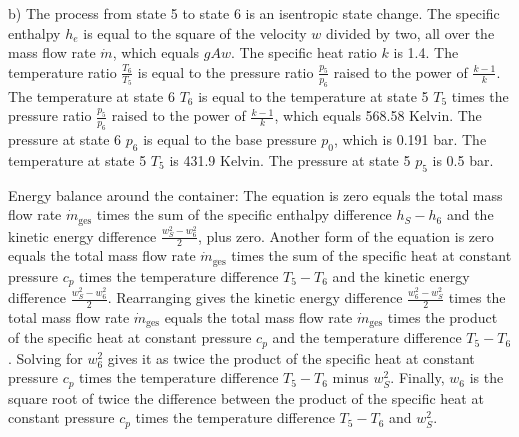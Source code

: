 b) The process from state 5 to state 6 is an isentropic state change. The specific enthalpy \( h_e \) is equal to the square of the velocity \( w \) divided by two, all over the mass flow rate \( \dot{m} \), which equals \( gAw \). The specific heat ratio \( k \) is 1.4. The temperature ratio \( \frac{T_6}{T_5} \) is equal to the pressure ratio \( \frac{p_5}{p_6} \) raised to the power of \( \frac{k-1}{k} \). The temperature at state 6 \( T_6 \) is equal to the temperature at state 5 \( T_5 \) times the pressure ratio \( \frac{p_5}{p_6} \) raised to the power of \( \frac{k-1}{k} \), which equals 568.58 Kelvin. The pressure at state 6 \( p_6 \) is equal to the base pressure \( p_0 \), which is 0.191 bar. The temperature at state 5 \( T_5 \) is 431.9 Kelvin. The pressure at state 5 \( p_5 \) is 0.5 bar.

Energy balance around the container:
The equation is zero equals the total mass flow rate \( \dot{m}_{\text{ges}} \) times the sum of the specific enthalpy difference \( h_S - h_6 \) and the kinetic energy difference \( \frac{w_S^2 - w_6^2}{2} \), plus zero. Another form of the equation is zero equals the total mass flow rate \( \dot{m}_{\text{ges}} \) times the sum of the specific heat at constant pressure \( c_p \) times the temperature difference \( T_5 - T_6 \) and the kinetic energy difference \( \frac{w_S^2 - w_6^2}{2} \). Rearranging gives the kinetic energy difference \( \frac{w_6^2 - w_S^2}{2} \) times the total mass flow rate \( \dot{m}_{\text{ges}} \) equals the total mass flow rate \( \dot{m}_{\text{ges}} \) times the product of the specific heat at constant pressure \( c_p \) and the temperature difference \( T_5 - T_6 \). Solving for \( w_6^2 \) gives it as twice the product of the specific heat at constant pressure \( c_p \) times the temperature difference \( T_5 - T_6 \) minus \( w_S^2 \). Finally, \( w_6 \) is the square root of twice the difference between the product of the specific heat at constant pressure \( c_p \) times the temperature difference \( T_5 - T_6 \) and \( w_S^2 \).